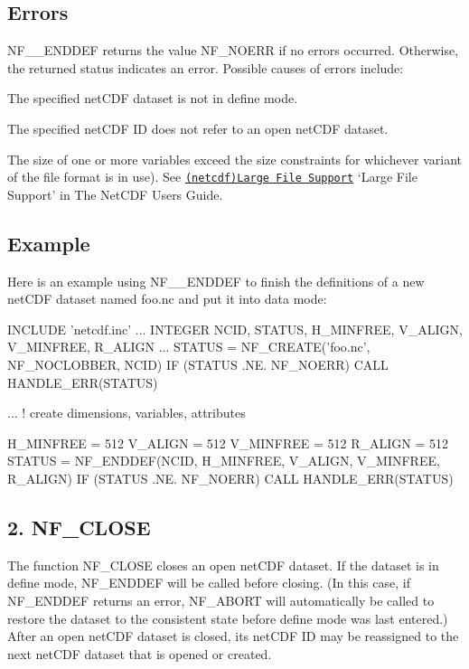 \subsection*{Errors }

N\+F\+\_\+\+\_\+\+E\+N\+D\+D\+EF returns the value N\+F\+\_\+\+N\+O\+E\+RR if no errors occurred. Otherwise, the returned status indicates an error. Possible causes of errors include\+:


\begin{DoxyItemize}
\item The specified net\+C\+DF dataset is not in define mode.
\item The specified net\+C\+DF ID does not refer to an open net\+C\+DF dataset.
\item The size of one or more variables exceed the size constraints for whichever variant of the file format is in use). See \href{netcdf.html#Large-File-Support}{\tt (netcdf)Large File Support} ‘\+Large File Support’ in The Net\+C\+DF Users Guide.
\end{DoxyItemize}

\subsection*{Example }

Here is an example using N\+F\+\_\+\+\_\+\+E\+N\+D\+D\+EF to finish the definitions of a new net\+C\+DF dataset named foo.\+nc and put it into data mode\+:


\begin{DoxyCode}
INCLUDE 'netcdf.inc'
   ...
INTEGER NCID, STATUS, H\_MINFREE, V\_ALIGN, V\_MINFREE, R\_ALIGN
   ...
STATUS = NF\_CREATE('foo.nc', NF\_NOCLOBBER, NCID)
IF (STATUS .NE. NF\_NOERR) CALL HANDLE\_ERR(STATUS)

   ...   ! create dimensions, variables, attributes

H\_MINFREE = 512
V\_ALIGN = 512
V\_MINFREE = 512
R\_ALIGN = 512
STATUS = NF\_ENDDEF(NCID, H\_MINFREE, V\_ALIGN, V\_MINFREE, R\_ALIGN)
IF (STATUS .NE. NF\_NOERR) CALL HANDLE\_ERR(STATUS)
\end{DoxyCode}
\hypertarget{nc_f77_interface_guide_f77_NF-CLOSE}{}\subsection{2. N\+F\+\_\+\+C\+L\+O\+S\+E }\label{nc_f77_interface_guide_f77_NF-CLOSE}
The function N\+F\+\_\+\+C\+L\+O\+SE closes an open net\+C\+DF dataset. If the dataset is in define mode, N\+F\+\_\+\+E\+N\+D\+D\+EF will be called before closing. (In this case, if N\+F\+\_\+\+E\+N\+D\+D\+EF returns an error, N\+F\+\_\+\+A\+B\+O\+RT will automatically be called to restore the dataset to the consistent state before define mode was last entered.) After an open net\+C\+DF dataset is closed, its net\+C\+DF ID may be reassigned to the next net\+C\+DF dataset that is opened or created.

